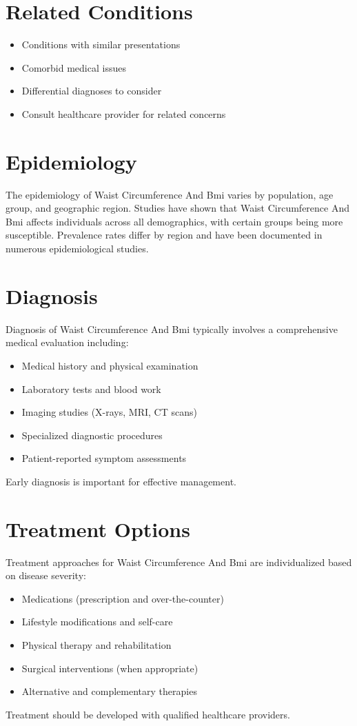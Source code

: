 \section*{Related Conditions}
\begin{itemize}
  \item Conditions with similar presentations
  \item Comorbid medical issues
  \item Differential diagnoses to consider
  \item Consult healthcare provider for related concerns
\end{itemize}

\section*{Epidemiology}
The epidemiology of Waist Circumference And Bmi varies by population, age group, and geographic region. Studies have shown that Waist Circumference And Bmi affects individuals across all demographics, with certain groups being more susceptible. Prevalence rates differ by region and have been documented in numerous epidemiological studies.

\section*{Diagnosis}
Diagnosis of Waist Circumference And Bmi typically involves a comprehensive medical evaluation including:
\begin{itemize}
  \item Medical history and physical examination
  \item Laboratory tests and blood work
  \item Imaging studies (X-rays, MRI, CT scans)
  \item Specialized diagnostic procedures
  \item Patient-reported symptom assessments
\end{itemize}
Early diagnosis is important for effective management.

\section*{Treatment Options}
Treatment approaches for Waist Circumference And Bmi are individualized based on disease severity:
\begin{itemize}
  \item Medications (prescription and over-the-counter)
  \item Lifestyle modifications and self-care
  \item Physical therapy and rehabilitation
  \item Surgical interventions (when appropriate)
  \item Alternative and complementary therapies
\end{itemize}
Treatment should be developed with qualified healthcare providers.

